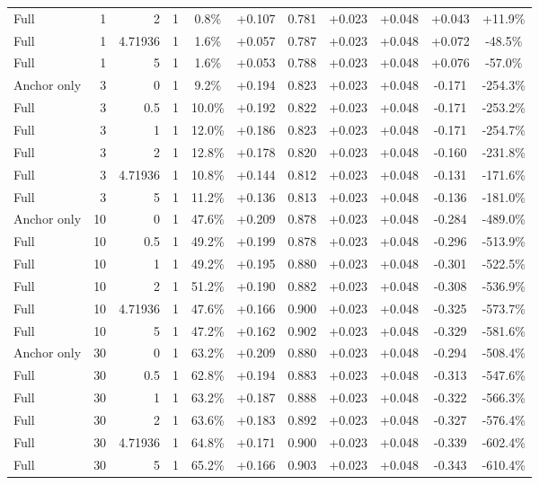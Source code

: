 \begin{table}[htbp]
\begin{tabular}{lrrrccccccc}
Full & 1 & 2 & 1 & 0.8\% & +0.107 & 0.781 & +0.023 & +0.048 & +0.043 & +11.9\% \\
Full & 1 & 4.71936 & 1 & 1.6\% & +0.057 & 0.787 & +0.023 & +0.048 & +0.072 & -48.5\% \\
Full & 1 & 5 & 1 & 1.6\% & +0.053 & 0.788 & +0.023 & +0.048 & +0.076 & -57.0\% \\
Anchor only & 3 & 0 & 1 & 9.2\% & +0.194 & 0.823 & +0.023 & +0.048 & -0.171 & -254.3\% \\
Full & 3 & 0.5 & 1 & 10.0\% & +0.192 & 0.822 & +0.023 & +0.048 & -0.171 & -253.2\% \\
Full & 3 & 1 & 1 & 12.0\% & +0.186 & 0.823 & +0.023 & +0.048 & -0.171 & -254.7\% \\
Full & 3 & 2 & 1 & 12.8\% & +0.178 & 0.820 & +0.023 & +0.048 & -0.160 & -231.8\% \\
Full & 3 & 4.71936 & 1 & 10.8\% & +0.144 & 0.812 & +0.023 & +0.048 & -0.131 & -171.6\% \\
Full & 3 & 5 & 1 & 11.2\% & +0.136 & 0.813 & +0.023 & +0.048 & -0.136 & -181.0\% \\
Anchor only & 10 & 0 & 1 & 47.6\% & +0.209 & 0.878 & +0.023 & +0.048 & -0.284 & -489.0\% \\
Full & 10 & 0.5 & 1 & 49.2\% & +0.199 & 0.878 & +0.023 & +0.048 & -0.296 & -513.9\% \\
Full & 10 & 1 & 1 & 49.2\% & +0.195 & 0.880 & +0.023 & +0.048 & -0.301 & -522.5\% \\
Full & 10 & 2 & 1 & 51.2\% & +0.190 & 0.882 & +0.023 & +0.048 & -0.308 & -536.9\% \\
Full & 10 & 4.71936 & 1 & 47.6\% & +0.166 & 0.900 & +0.023 & +0.048 & -0.325 & -573.7\% \\
Full & 10 & 5 & 1 & 47.2\% & +0.162 & 0.902 & +0.023 & +0.048 & -0.329 & -581.6\% \\
Anchor only & 30 & 0 & 1 & 63.2\% & +0.209 & 0.880 & +0.023 & +0.048 & -0.294 & -508.4\% \\
Full & 30 & 0.5 & 1 & 62.8\% & +0.194 & 0.883 & +0.023 & +0.048 & -0.313 & -547.6\% \\
Full & 30 & 1 & 1 & 63.2\% & +0.187 & 0.888 & +0.023 & +0.048 & -0.322 & -566.3\% \\
Full & 30 & 2 & 1 & 63.6\% & +0.183 & 0.892 & +0.023 & +0.048 & -0.327 & -576.4\% \\
Full & 30 & 4.71936 & 1 & 64.8\% & +0.171 & 0.900 & +0.023 & +0.048 & -0.339 & -602.4\% \\
Full & 30 & 5 & 1 & 65.2\% & +0.166 & 0.903 & +0.023 & +0.048 & -0.343 & -610.4\% \\

\end{tabular}
\end{table}
